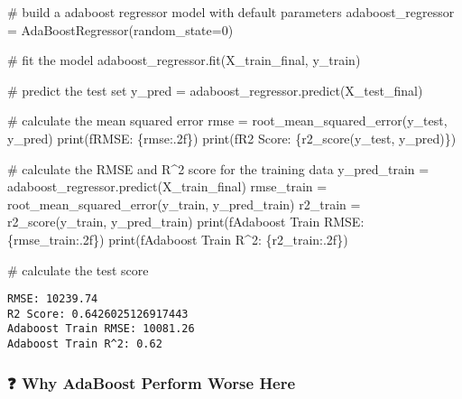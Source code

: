 \documentclass[
  letterpaper,
  DIV=11,
  numbers=noendperiod]{scrreprt}
\newenvironment{Shaded}{\begin{snugshade}}{\end{snugshade}}
\newcommand{\BuiltInTok}[1]{\textcolor[rgb]{0.00,0.23,0.31}{#1}}
\newcommand{\CommentTok}[1]{\textcolor[rgb]{0.37,0.37,0.37}{#1}}
\newcommand{\DecValTok}[1]{\textcolor[rgb]{0.68,0.00,0.00}{#1}}
\newcommand{\NormalTok}[1]{\textcolor[rgb]{0.00,0.23,0.31}{#1}}
\newcommand{\OperatorTok}[1]{\textcolor[rgb]{0.37,0.37,0.37}{#1}}
\newcommand{\SpecialCharTok}[1]{\textcolor[rgb]{0.37,0.37,0.37}{#1}}
\newcommand{\SpecialStringTok}[1]{\textcolor[rgb]{0.13,0.47,0.30}{#1}}
\begin{document}
\begin{Shaded}
\begin{Highlighting}[]

\CommentTok{\# build a adaboost regressor model with default parameters}
\NormalTok{adaboost\_regressor }\OperatorTok{=}\NormalTok{ AdaBoostRegressor(random\_state}\OperatorTok{=}\DecValTok{0}\NormalTok{)}

\CommentTok{\# fit the model}
\NormalTok{adaboost\_regressor.fit(X\_train\_final, y\_train)}

\CommentTok{\# predict the test set}
\NormalTok{y\_pred }\OperatorTok{=}\NormalTok{ adaboost\_regressor.predict(X\_test\_final)}

\CommentTok{\# calculate the mean squared error}
\NormalTok{rmse }\OperatorTok{=}\NormalTok{ root\_mean\_squared\_error(y\_test, y\_pred)}
\BuiltInTok{print}\NormalTok{(}\SpecialStringTok{f\textquotesingle{}RMSE: }\SpecialCharTok{\{}\NormalTok{rmse}\SpecialCharTok{:.2f\}}\SpecialStringTok{\textquotesingle{}}\NormalTok{)}
\BuiltInTok{print}\NormalTok{(}\SpecialStringTok{f\textquotesingle{}R2 Score: }\SpecialCharTok{\{}\NormalTok{r2\_score(y\_test, y\_pred)}\SpecialCharTok{\}}\SpecialStringTok{\textquotesingle{}}\NormalTok{)}


\CommentTok{\# calculate the RMSE and R\^{}2 score for the training data}
\NormalTok{y\_pred\_train }\OperatorTok{=}\NormalTok{ adaboost\_regressor.predict(X\_train\_final)}
\NormalTok{rmse\_train }\OperatorTok{=}\NormalTok{ root\_mean\_squared\_error(y\_train, y\_pred\_train)}
\NormalTok{r2\_train }\OperatorTok{=}\NormalTok{ r2\_score(y\_train, y\_pred\_train)}
\BuiltInTok{print}\NormalTok{(}\SpecialStringTok{f\textquotesingle{}Adaboost Train RMSE: }\SpecialCharTok{\{}\NormalTok{rmse\_train}\SpecialCharTok{:.2f\}}\SpecialStringTok{\textquotesingle{}}\NormalTok{)}
\BuiltInTok{print}\NormalTok{(}\SpecialStringTok{f\textquotesingle{}Adaboost Train R\^{}2: }\SpecialCharTok{\{}\NormalTok{r2\_train}\SpecialCharTok{:.2f\}}\SpecialStringTok{\textquotesingle{}}\NormalTok{)}

\CommentTok{\# calculate the test score}
\end{Highlighting}
\end{Shaded}

\begin{verbatim}
RMSE: 10239.74
R2 Score: 0.6426025126917443
Adaboost Train RMSE: 10081.26
Adaboost Train R^2: 0.62
\end{verbatim}

\subsubsection{❓ Why AdaBoost Perform Worse
Here}\label{why-adaboost-perform-worse-here}
\end{document}
